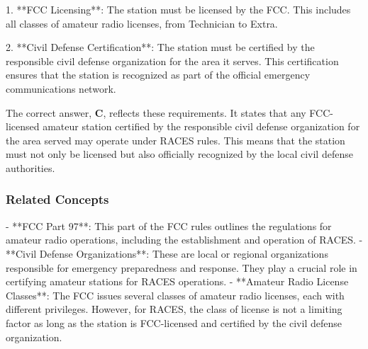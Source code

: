 1. **FCC Licensing**: The station must be licensed by the FCC. This includes all classes of amateur radio licenses, from Technician to Extra.

2. **Civil Defense Certification**: The station must be certified by the responsible civil defense organization for the area it serves. This certification ensures that the station is recognized as part of the official emergency communications network.

The correct answer, \textbf{C}, reflects these requirements. It states that any FCC-licensed amateur station certified by the responsible civil defense organization for the area served may operate under RACES rules. This means that the station must not only be licensed but also officially recognized by the local civil defense authorities.

\subsubsection{Related Concepts}
- **FCC Part 97**: This part of the FCC rules outlines the regulations for amateur radio operations, including the establishment and operation of RACES.
- **Civil Defense Organizations**: These are local or regional organizations responsible for emergency preparedness and response. They play a crucial role in certifying amateur stations for RACES operations.
- **Amateur Radio License Classes**: The FCC issues several classes of amateur radio licenses, each with different privileges. However, for RACES, the class of license is not a limiting factor as long as the station is FCC-licensed and certified by the civil defense organization.

